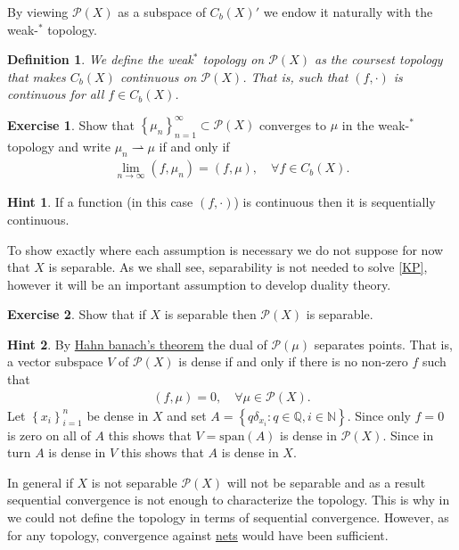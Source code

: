 \documentclass[
    a4paper,
    DIV=14,
    abstract=true,
    numbers=noenddot
]
{scrartcl}
\newtheorem{definition}[definition]{Definition}
\theoremstyle{definition}
\newtheorem{exercise}{Exercise}
\newtheorem*{hint}{Hint}
\newcommand{\set}[1]{\left\{#1\right\}}
\newcommand{\rmm}[1]{\mathrm{#1}}
\newcommand{\N}{\mathbb{N}}
\newcommand{\Q}{\mathbb{Q}}
\newcommand{\Pp}{\mathcal{P}}
\begin{document}
By viewing $\Pp (X)$ as a subspace of $C_b(X)'$ we endow it naturally with the weak-$^*$ topology.
\begin{definition}\label{weakdef}
    We define the weak$^*$ topology on $\Pp (X)$ as the coursest topology that makes $C_b(X)$ continuous on $\Pp(X)$. That is, such that $(f, \cdot )$ is continuous for all $f \in C_b(X)$.
\end{definition}
\begin{exercise}
    Show that $\set{\mu _n}_{n=1}^ \infty \subset \Pp (X)$ converges to $\mu $ in the weak-$^*$ topology and write $\mu_n \rightharpoonup \mu $ if and only if
    \begin{align*}
        \lim_{n \to \infty}(f, \mu _n)= (f,\mu ), \quad\forall f \in C_b(X).
    \end{align*}
\end{exercise}
\begin{hint}
    If a function (in this case $(f,\cdot )$) is continuous then it is sequentially continuous.
\end{hint}
To show exactly where each assumption is necessary we do not suppose for now that $X$ is separable. As we shall see, separability is not needed to solve \eqref{KP}, however it will be an important assumption to develop duality theory.
\begin{exercise}
    Show that if $X$ is separable then $\Pp (X)$ is separable.
\end{exercise}
\begin{hint}
    By \href{https://en.wikipedia.org/wiki/Hahn%E2%80%93Banach_theorem#:~:text=Mazur%27s%20theorem-,clarifies%20that,-vector%20subspaces%20(even}{Hahn banach's theorem} the dual of $\Pp (\mu )$ separates points. That is, a vector subspace $V$  of $\Pp(X)$ is dense if and only if there is no non-zero $f$ such that 
    \begin{align*}
        (f, \mu )=0 , \quad\forall \mu \in \Pp (X).
    \end{align*}
    Let $\set{x_i}_{i=1}^n$ be dense in $X$ and set   $A = \set{q\delta _{x_i}: q \in \Q, i \in \N}$. Since only $f=0$ is zero on all of $A$ this shows that $ V=\rmm{span}(A)$ is dense in $\Pp(X)$. Since in turn $A$ is dense in $V$ this shows that $A$ is dense in $X$.
\end{hint}
In general if $X$ is not separable $\Pp (X)$ will not be separable and as a result sequential convergence is not enough to characterize the topology. This is why in  we could not define the topology in terms of sequential convergence. However, as for any topology, convergence against \href{https://en.wikipedia.org/wiki/Net_(mathematics)}{nets} would have been sufficient.
\end{document}
